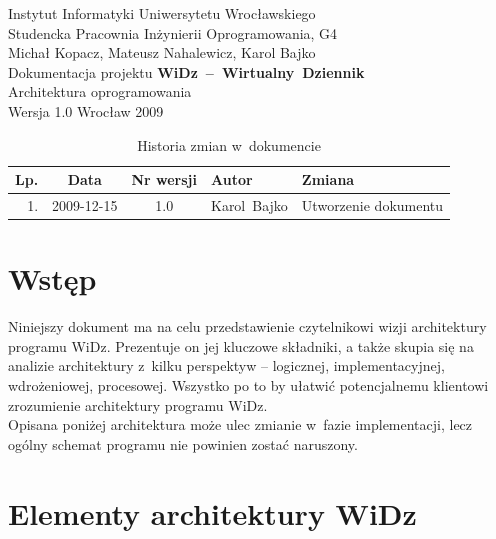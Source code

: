 \documentclass[12pt,leqno,twoside]{mwart}
\begin{document}
\begin{titlepage}
\begin{center}
Instytut Informatyki Uniwersytetu Wrocławskiego \\
Studencka Pracownia Inżynierii Oprogramowania, G4 \\
\vspace{4cm}
\Large Michał Kopacz, Mateusz Nahalewicz, Karol Bajko \\
\vspace{0.5cm}
\huge Dokumentacja projektu \mbox{\textbf{WiDz -- Wirtualny Dziennik}} \\ \Large Architektura oprogramowania\\
\vspace{1cm}
\normalsize Wersja 1.0
\vfill
\normalsize Wrocław 2009
\end{center}
\end{titlepage}

\newpage
\vfill
\begin{table}
	\centering
	\caption{Historia zmian w~dokumencie}
		\begin{tabular}{|r|c|c|p{}|l|}
		\hline
		Lp. 	& Data       & Nr wersji 	& Autor           		& Zmiana \\ \hline
		1.   	& 2009-12-15 & 1.0       	& \mbox{Karol Bajko} & Utworzenie dokumentu \\ \hline
		\end{tabular}
\end{table}

\tableofcontents
\newpage

\section{Wstęp}
\noindent Niniejszy dokument ma na celu przedstawienie czytelnikowi wizji architektury programu WiDz. Prezentuje on jej kluczowe składniki, a także skupia się na analizie architektury z~kilku perspektyw -- logicznej, implementacyjnej, wdrożeniowej, procesowej. Wszystko po to by ułatwić potencjalnemu klientowi zrozumienie architektury programu WiDz.\\
\indent Opisana poniżej architektura może ulec zmianie w~fazie implementacji, lecz ogólny schemat programu nie powinien zostać naruszony.

\section{Elementy architektury WiDz}
\end{document}

